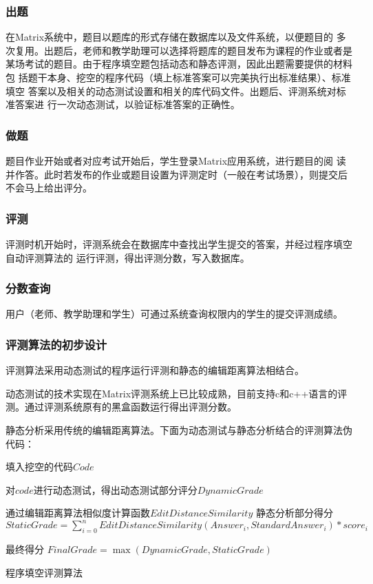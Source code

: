 \subsubsection{出题}

在Matrix系统中，题目以题库的形式存储在数据库以及文件系统，以便题目的
多次复用。出题后，老师和教学助理可以选择将题库的题目发布为课程的作业或者是
某场考试的题目。由于程序填空题包括动态和静态评测，因此出题需要提供的材料包
括题干本身、挖空的程序代码（填上标准答案可以完美执行出标准结果）、标准填空
答案以及相关的动态测试设置和相关的库代码文件。出题后、评测系统对标准答案进
行一次动态测试，以验证标准答案的正确性。

\subsubsection{做题}

题目作业开始或者对应考试开始后，学生登录Matrix应用系统，进行题目的阅
读并作答。此时若发布的作业或题目设置为评测定时（一般在考试场景），则提交后
不会马上给出评分。

\subsubsection{评测}

评测时机开始时，评测系统会在数据库中查找出学生提交的答案，并经过程序填空自动评测算法的
运行评测，得出评测分数，写入数据库。

\subsubsection{分数查询}

用户（老师、教学助理和学生）可通过系统查询权限内的学生的提交评测成绩。

\subsubsection{评测算法的初步设计}

评测算法采用动态测试的程序运行评测和静态的编辑距离算法相结合。

动态测试的技术实现在Matrix评测系统上已比较成熟，目前支持c和c++语言的评
测。通过评测系统原有的黑盒函数运行得出评测分数。

静态分析采用传统的编辑距离算法。下面为动态测试与静态分析结合的评测算法伪代码：

\begin{algorithm}[h]
 {
  填入挖空的代码$Code$
}

对$code$进行动态测试，得出动态测试部分评分$DynamicGrade$

通过编辑距离算法相似度计算函数$EditDistanceSimilarity$
静态分析部分得分$StaticGrade = \sum_{i=0}^{n} EditDistanceSimilarity\left(Answer_i, StandardAnswer_i\right) * score_i$

最终得分 $FinalGrade = \max \left(DynamicGrade, StaticGrade\right)$

\caption{程序填空评测算法}
\label{algo:program_filling_algorithm}
\end{algorithm}

